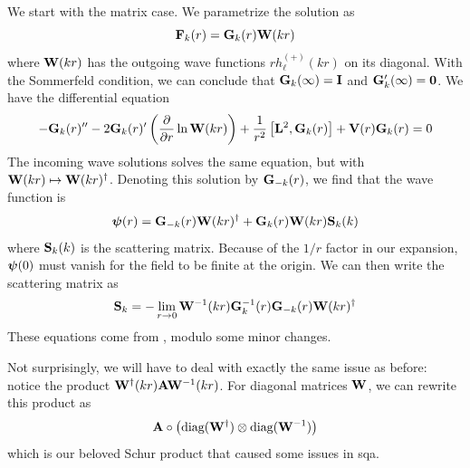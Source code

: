 We start with the matrix case. We parametrize the solution as
  \begin{equation}
    \mathbf{F}_k(r) = \mathbf{G}_k(r)\mathbf{W}(kr)
  \end{equation}
where $\mathbf{W}(kr)$ has the outgoing wave functions $rh_\ell^{(+)}(kr)$ on its diagonal. 
With the Sommerfeld condition, we can conclude that $\mathbf{G}_k(\infty) = \mathbf{I}$ and 
$\mathbf{G}_k'(\infty)=\mathbf{0}$. We have the differential equation
  \begin{multline}
   -\mathbf{G}_k(r)''-2\mathbf{G}_k(r)'\left(\frac{\partial}{\partial r}\ln\mathbf{W}(kr)\right)
    +\frac{1}{r^2}\left[\mathbf{L}^2,\mathbf{G}_k(r)\right]+\mathbf{V}(r)\mathbf{G}_k(r)=0
  \end{multline}
The incoming wave solutions solves the same equation, but with
$\mathbf{W}(kr)\mapsto \mathbf{W}(kr)^\dagger$. Denoting this solution 
by $\mathbf{G}_{-k}(r)$, we find that the wave function is
  \begin{equation}
    \boldsymbol{\psi}(r) = \mathbf{G}_{-k}(r)\mathbf{W}(kr)^\dagger+\mathbf{G}_k(r)\mathbf{W}(kr)\mathbf{S}_k(k)
  \end{equation}
where $\mathbf{S}_k(k)$ is the scattering matrix. Because of the
$1/r$ factor in our expansion, $\boldsymbol{\psi}(0)$ must vanish 
for the field to be finite at the origin. We can then write the 
scattering matrix as
  \begin{equation}
   \mathbf{S}_k = -\lim_{r\rightarrow0}\mathbf{W}^{-1}(kr)\mathbf{G}^{-1}_k(r)\mathbf{G}_{-k}(r)\mathbf{W}(kr)^\dagger
  \end{equation}
These equations come from \cite{FOR2012}, modulo some minor changes.

Not surprisingly, we will have to deal with exactly the same issue as before: 
notice the product $\mathbf{W}^\dagger(kr)\mathbf{A}\mathbf{W}^{-1}(kr)$. For diagonal
matrices $\mathbf{W}$, we can rewrite this product as
  \begin{equation*}
    \mathbf{A}\circ\left(\text{diag}(\mathbf{W}^\dagger)\otimes\text{diag}(\mathbf{W}^{-1})\right)
  \end{equation*}
which is our beloved Schur product that caused some issues in \gls{sqa}. 

